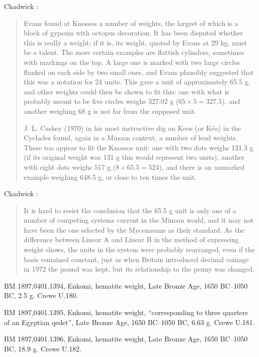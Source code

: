 \documentclass{article}
\begin{document}
Chadwick \cite[pp.~103--104]{chadwick}:

\begin{quote}
Evans found at Knossos a number of weights, the largest
of which is a block of gypsum with octopus decoration. It has been 
disputed whether this is really a weight; if it is, its weight, quoted by Evans
at 29 kg, must be a talent. The more certain examples are flattish cylinders,
sometimes with markings on the top. A large one is marked with two large
circles flanked on each side by two small ones, and Evans plausibly
suggested that this was a notation for 24 units. This gave a unit of
approximately 65.5 g, and other weights could then be shown to fit this:
one with what is probably meant to be five circles weighs 327.02 g
($65 \times 5 = 327.5$), and another weighing 68 g is not far from the supposed
unit.

J. L. Caskey (1970) in his most instructive dig on Keos (or K\'ea) in the
Cyclades found, again in a Minoan context, a number of lead weights.
These too appear to fit the Knossos unit: one with two dots weighs 121.3 g
(if its original weight was 131 g this would represent two units), another
with eight dots weighs 517 g ($8 \times 65.5=524$), and there is an unmarked
example weighing 648.5 g, or close to ten times the unit.
\end{quote}

Chadwick \cite[p.~105]{chadwick}:

\begin{quote}
It is hard to resist the conclusion
that the 65.5 g unit is only one of a number of competing systems current in
the Minoan world, and it may not have been the one selected by the
Mycenaeans as their standard. As the difference between Linear A and
Linear B in the method of expressing weight shows, the units in the system
were probably rearranged, even if the basis remained constant, just as
when Britain introduced decimal coinage in 1972 the pound was kept, but
its relationship to the penny was changed.
\end{quote}



BM 1897,0401.1394, Enkomi, hematite weight,
Late Bronze Age, 1650 BC--1050 BC,
2.5 g.
Crewe U.180.

BM 1897,0401.1395, Enkomi, hematite weight, ``corresponding to three quarters of an Egyptian qedet'',
Late Bronze Age, 1650 BC--1050 BC,
6.63 g.
Crewe U.181.

BM 1897,0401.1396, Enkomi, hematite weight,
Late Bronze Age, 1650 BC--1050 BC,
18.9 g.
Crewe U.182.
\end{document}
